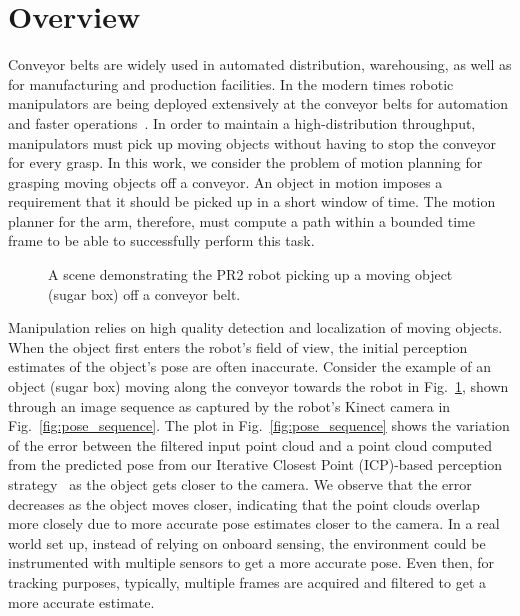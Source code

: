 \documentclass[a4paper]{report}
\begin{document}
\section{Overview}
Conveyor belts are widely used in automated distribution, warehousing, as well as for manufacturing and production facilities. In the modern times robotic manipulators are being deployed extensively at the conveyor belts for automation and faster operations~\cite{zhang2018gilbreth}. In order to maintain a high-distribution throughput, manipulators must pick up moving objects without having to stop the conveyor for every grasp. In this work, we consider the problem of motion planning for grasping moving objects off a conveyor. An object in motion imposes a requirement that it should be picked up in a short window of time. The motion planner for the arm, therefore, must compute a path within a bounded time frame to be able to successfully perform this task.

\begin{figure}[t]
    \centering
    \caption{
    \CaptionTextSize
    A scene demonstrating the PR2 robot picking up a moving object (sugar box) off a conveyor belt.}
    \label{fig:intro_pic}
\end{figure}

Manipulation relies on high quality detection and localization of moving objects. When the object first enters the robot's field of view, the initial perception estimates of the object's pose are often inaccurate. Consider the example of an object (sugar box) moving along the conveyor towards the robot in Fig.~\ref{fig:intro_pic}, shown through an image sequence as captured by the robot's Kinect camera in Fig.~\ref{fig:pose_sequence}. 
%
The plot in Fig.~\ref{fig:pose_sequence} shows the variation of the error between the filtered input point cloud and a point cloud computed from the predicted pose from our Iterative Closest Point (ICP)-based perception strategy~\cite{ISL19} as the object gets closer to the camera. We observe that the error decreases as the object moves closer, indicating that the point clouds overlap more closely due to more accurate pose estimates closer to the camera.
In a real world set up, instead of relying on onboard sensing, the environment could be instrumented with multiple sensors to get a more accurate pose. Even then, for tracking purposes, typically, multiple frames are acquired and filtered to get a more accurate estimate.
\end{document}
